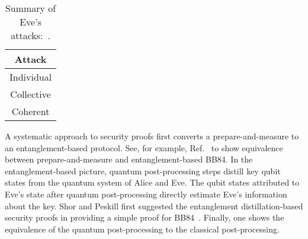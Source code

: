 \begin{table}[htb]
	\centering
	\begin{tabular}{c}
		\toprule
			Attack \\
		\midrule
			Individual \\
			Collective \\
			Coherent \\
		\bottomrule
	\end{tabular}
	\caption{Summary of Eve's attacks:~\cite[p.~128]{Wolf2021}.}
\end{table}
A systematic approach to security proofs first converts a prepare-and-measure to an entanglement-based protocol.
See, for example, Ref.~\cite[p.~106]{Wolf2021} to show equivalence between prepare-and-measure and entanglement-based BB84.
In the entanglement-based picture, quantum post-processing steps distill key qubit states from the quantum system of Alice and Eve.
The qubit states attributed to Eve's state after quantum post-processing directly estimate Eve's information about the key.
Shor and Peskill first suggested the entanglement distillation-based security proofs in providing a simple proof for BB84~\cite{Shor2000}.
Finally, one shows the equivalence of the quantum post-processing to the classical post-processing.